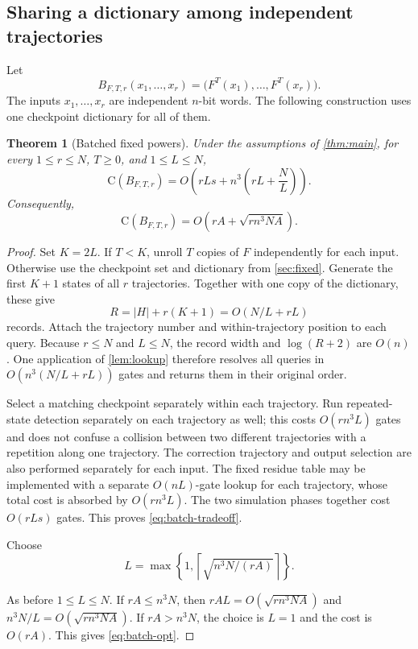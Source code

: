 \documentclass[11pt]{article}
\newtheorem{theorem}{Theorem}[section]
\theoremstyle{definition}
\theoremstyle{remark}
\newcommand{\CC}{\mathrm{C}}
\newcommand{\ceil}[1]{\left\lceil #1\right\rceil}
\numberwithin{equation}{section}
\begin{document}
\subsection{Sharing a dictionary among independent trajectories}
\label{sec:batch}

Let
\[
  B_{F,T,r}(x_1,\ldots,x_r)
   =\bigl(F^T(x_1),\ldots,F^T(x_r)\bigr).
\]
The inputs $x_1,\ldots,x_r$ are independent $n$-bit words.  The following
construction uses one checkpoint dictionary for all of them.

\begin{theorem}[Batched fixed powers]\label{thm:batch}
Under the assumptions of \cref{thm:main}, for every $1\leq r\leq N$,
$T\geq 0$, and $1\leq L\leq N$,
\begin{equation}\label{eq:batch-tradeoff}
  \CC(B_{F,T,r})
   =O\!\left(rLs+n^3\left(rL+\frac{N}{L}\right)\right).
\end{equation}
Consequently,
\begin{equation}\label{eq:batch-opt}
  \CC(B_{F,T,r})
   =O\!\left(rA+\sqrt{rn^3NA}\right).
\end{equation}
\end{theorem}

\begin{proof}
Set $K=2L$.  If $T<K$, unroll $T$ copies of $F$ independently for each
input.  Otherwise use the checkpoint set and dictionary from
\cref{sec:fixed}.  Generate the first $K+1$ states of all $r$ trajectories.
Together with one copy of the dictionary, these give
\[
  R=|H|+r(K+1)=O(N/L+rL)
\]
records.  Attach the trajectory number and within-trajectory position to
each query.  Because $r\leq N$ and $L\leq N$, the record width and
$\log(R+2)$ are $O(n)$.  One application of \cref{lem:lookup} therefore
resolves all queries in $O(n^3(N/L+rL))$ gates and returns them in their
original order.

Select a matching checkpoint separately within each trajectory.  Run
repeated-state detection separately on each trajectory as well; this
costs $O(rn^3L)$ gates and does not confuse a collision between two
different trajectories with a repetition along one trajectory.
The correction trajectory and output selection are also performed
separately for each input.  The fixed residue table may be implemented
with a separate $O(nL)$-gate lookup for each trajectory, whose total
cost is absorbed by $O(rn^3L)$.  The two simulation phases together cost
$O(rLs)$ gates.  This proves \cref{eq:batch-tradeoff}.

\begin{samepage}
Choose
\[
  L=\max\left\{1,\ceil{\sqrt{n^3N/(rA)}}\right\}.
\]
\end{samepage}
As before $1\leq L\leq N$.  If $rA\leq n^3N$, then
$rAL=O(\sqrt{rn^3NA})$ and $n^3N/L=O(\sqrt{rn^3NA})$.
If $rA>n^3N$, the choice is $L=1$ and the cost is $O(rA)$.
This gives \cref{eq:batch-opt}.
\end{proof}
\end{document}
